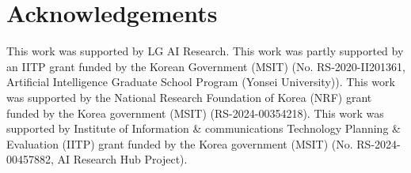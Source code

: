 \section*{Acknowledgements}

This work was supported by LG AI Research. This work was partly supported by an IITP grant funded by the Korean Government (MSIT) (No. RS-2020-II201361, Artificial Intelligence Graduate School Program (Yonsei University)). This work was supported by the National Research Foundation of Korea (NRF) grant funded by the Korea government (MSIT) (RS-2024-00354218). This work was supported by Institute of Information \& communications Technology Planning \& Evaluation (IITP) grant funded by the Korea government (MSIT) (No. RS-2024-00457882, AI Research Hub Project).